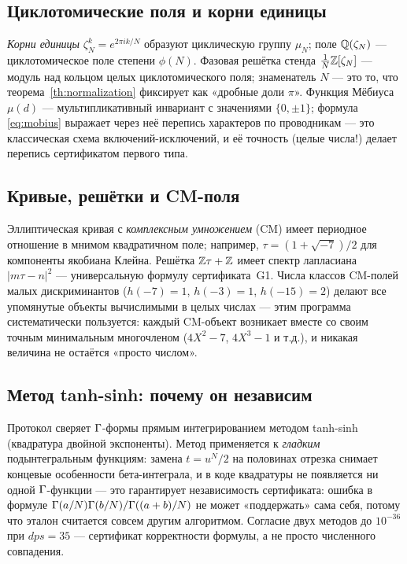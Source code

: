 \subsection{Циклотомические поля и корни единицы}

\emph{Корни единицы} $\zeta_N^k=e^{2\pi ik/N}$ образуют циклическую
группу $\mu_N$; поле $\mathbb{Q}(\zeta_N)$ --- циклотомическое поле
степени $\phi(N)$. Фазовая решётка стенда $\frac1N\mathbb{Z}[\zeta_N]$ ---
модуль над кольцом целых циклотомического поля; знаменатель $N$ ---
это то, что теорема~\ref{th:normalization} фиксирует как
«дробные доли $\pi$». Функция Мёбиуса $\mu(d)$ ---
мультипликативный инвариант с значениями
$\{0,\pm1\}$; формула \eqref{eq:mobius} выражает через неё перепись
характеров по проводникам --- это классическая схема
включений-исключений, и её точность (целые числа!) делает перепись
сертификатом первого типа.

\subsection{Кривые, решётки и CM-поля}

Эллиптическая кривая с \emph{комплексным умножением} (CM) имеет
периодное отношение в мнимом квадратичном поле; например,
$\tau=(1+\sqrt{-7})/2$ для компоненты якобиана Клейна. Решётка
$\mathbb{Z}\tau+\mathbb{Z}$ имеет спектр лапласиана $|m\tau-n|^2$ ---
универсальную формулу сертификата~G1. Числа классов CM-полей
малых дискриминантов ($h(-7)=1$, $h(-3)=1$, $h(-15)=2$) делают
все упомянутые объекты вычислимыми в целых числах --- этим
программа систематически пользуется: каждый CM-объект возникает
вместе со своим точным минимальным многочленом
($4X^2-7$, $4X^3-1$ и т.д.), и никакая величина не остаётся
«просто числом».

\subsection{Метод tanh-sinh: почему он независим}

Протокол сверяет $\Gamma$-формы прямым интегрированием методом
tanh-sinh (квадратура двойной экспоненты). Метод применяется к
\emph{гладким} подынтегральным функциям: замена $t=u^N/2$ на
половинах отрезка снимает концевые особенности бета-интеграла, и
в коде квадратуры не появляется ни одной $\Gamma$-функции --- это
гарантирует независимость сертификата: ошибка в формуле
$\Gamma(a/N)\Gamma(b/N)/\Gamma((a+b)/N)$ не может «поддержать» сама себя,
потому что эталон считается совсем другим алгоритмом. Согласие двух
методов до $10^{-36}$ при $dps=35$ --- сертификат корректности
формулы, а не просто численного совпадения.

